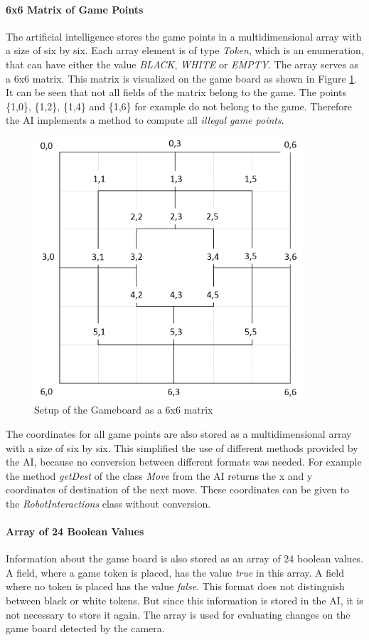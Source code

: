 \documentclass[a4paper]{spie}  %
\begin{document}
\begin{large}
\paragraph{6x6 Matrix of Game Points}
The artificial intelligence stores the game points in a multidimensional array with a size of six by six. Each array element is of type \emph{Token}, which is an enumeration, that can have either the value \emph{BLACK}, \emph{WHITE} or \emph{EMPTY}. The array serves as a 6x6 matrix. This matrix is visualized on the game board as shown in Figure \ref{setup_board}. It can be seen that not all fields of the matrix belong to the game. The points \{1,0\}, \{1,2\}, \{1,4\} and \{1,6\} for example do not belong to the game. Therefore the AI implements a method to compute all \emph{illegal game points}.\\
\begin{figure}[h]
\includegraphics[width=10cm]{images/setup_board.png}
\centering
\caption{Setup of the Gameboard as a 6x6 matrix}
\label{setup_board}
\end{figure}
The coordinates for all game points are also stored as a multidimensional array with a size of six by six. This simplified the use of different methods provided by the AI, because no conversion between different formats was needed. For example the method \emph{getDest} of the class \emph{Move} from the AI returns the x and y coordinates of destination of the next move. These coordinates can be given to the \emph{RobotInteractions} class without conversion.
\paragraph{Array of 24 Boolean Values}
Information about the game board is also stored as an array of 24 boolean values. A field, where a game token is placed, has the value \emph{true} in this array. A field where no token is placed has the value \emph{false}. This format does not distinguish between black or white tokens. But since this information is stored in the AI, it is not necessary to store it again. The array is used for evaluating changes on the game board detected by the camera.


\end{large}
\end{document}
